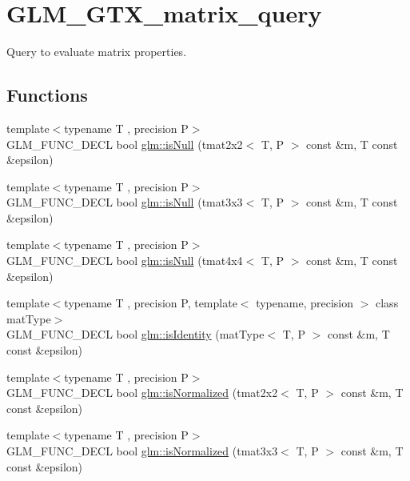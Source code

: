 \hypertarget{group__gtx__matrix__query}{\section{G\-L\-M\-\_\-\-G\-T\-X\-\_\-matrix\-\_\-query}
\label{group__gtx__matrix__query}
}


Query to evaluate matrix properties.  


\subsection*{Functions}
\begin{DoxyCompactItemize}
\item 
{\footnotesize template$<$typename T , precision P$>$ }\\G\-L\-M\-\_\-\-F\-U\-N\-C\-\_\-\-D\-E\-C\-L bool \hyperlink{group__gtx__matrix__query_ga37e535cbeaea383b8c1247b98875cd4b}{glm\-::is\-Null} (tmat2x2$<$ T, P $>$ const \&m, T const \&epsilon)
\item 
{\footnotesize template$<$typename T , precision P$>$ }\\G\-L\-M\-\_\-\-F\-U\-N\-C\-\_\-\-D\-E\-C\-L bool \hyperlink{group__gtx__matrix__query_gac67a5c7e029a84b74b02ac9599b8972d}{glm\-::is\-Null} (tmat3x3$<$ T, P $>$ const \&m, T const \&epsilon)
\item 
{\footnotesize template$<$typename T , precision P$>$ }\\G\-L\-M\-\_\-\-F\-U\-N\-C\-\_\-\-D\-E\-C\-L bool \hyperlink{group__gtx__matrix__query_ga326de496972051413c7b44b85fc9cb6e}{glm\-::is\-Null} (tmat4x4$<$ T, P $>$ const \&m, T const \&epsilon)
\item 
{\footnotesize template$<$typename T , precision P, template$<$ typename, precision $>$ class mat\-Type$>$ }\\G\-L\-M\-\_\-\-F\-U\-N\-C\-\_\-\-D\-E\-C\-L bool \hyperlink{group__gtx__matrix__query_gafc1ce12c738b8c5d007179e615609330}{glm\-::is\-Identity} (mat\-Type$<$ T, P $>$ const \&m, T const \&epsilon)
\item 
{\footnotesize template$<$typename T , precision P$>$ }\\G\-L\-M\-\_\-\-F\-U\-N\-C\-\_\-\-D\-E\-C\-L bool \hyperlink{group__gtx__matrix__query_ga11a8d5cdb36496b85f61e4f5f7f2602c}{glm\-::is\-Normalized} (tmat2x2$<$ T, P $>$ const \&m, T const \&epsilon)
\item 
{\footnotesize template$<$typename T , precision P$>$ }\\G\-L\-M\-\_\-\-F\-U\-N\-C\-\_\-\-D\-E\-C\-L bool \hyperlink{group__gtx__matrix__query_ga351bcc8d485d329b78cfa875e084964d}{glm\-::is\-Normalized} (tmat3x3$<$ T, P $>$ const \&m, T const \&epsilon)

\end{DoxyCompactItemize}
